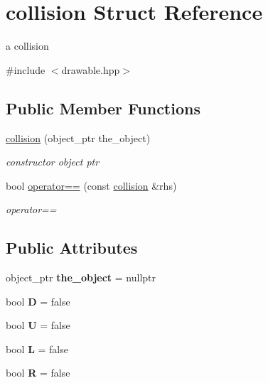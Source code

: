 \hypertarget{structcollision}{}\section{collision Struct Reference}
\label{structcollision}


a collision  




{\ttfamily \#include $<$drawable.\+hpp$>$}

\subsection*{Public Member Functions}
\begin{DoxyCompactItemize}
\item 
\hyperlink{structcollision_a8e4d3b4a9355c8946c0ad06ccc6e8d36}{collision} (object\+\_\+ptr the\+\_\+object)
\begin{DoxyCompactList}\small\item\em constructor object ptr \end{DoxyCompactList}\item 
bool \hyperlink{structcollision_ab1721e643a7906b3e4319a86315fce1b}{operator==} (const \hyperlink{structcollision}{collision} \&rhs)
\begin{DoxyCompactList}\small\item\em operator== \end{DoxyCompactList}\end{DoxyCompactItemize}
\subsection*{Public Attributes}
\begin{DoxyCompactItemize}
\item 
\mbox{\label{structcollision_a7ed36890448403a8a50bf90565255e42}} 
object\+\_\+ptr {\bfseries the\+\_\+object} = nullptr
\item 
\mbox{\label{structcollision_a650a2bb40b437483c892b299c21920e8}} 
bool {\bfseries D} = false
\item 
\mbox{\label{structcollision_a01f73e208a2d2c858a157ab895a58509}} 
bool {\bfseries U} = false
\item 
\mbox{\label{structcollision_ae07e40f8555ca518bf68ab3d85fcdb8e}} 
bool {\bfseries L} = false
\item 
\mbox{\label{structcollision_a89956863ae123b47eaf477b785a60a58}} 
bool {\bfseries R} = false
\end{DoxyCompactItemize}


